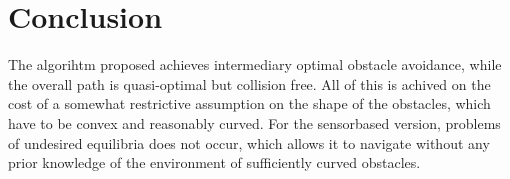 \documentclass[a4paper]{article}
\begin{document}
\section{Conclusion}
The algorihtm proposed achieves intermediary optimal obstacle avoidance, while the overall path is quasi-optimal but collision free. All of this is achived on the cost of a somewhat restrictive assumption on the shape of the obstacles, which have to be convex and reasonably curved. For the sensorbased version, problems of undesired equilibria does not occur, which allows it to navigate without any prior knowledge of the environment of sufficiently curved obstacles. 
\end{document}
